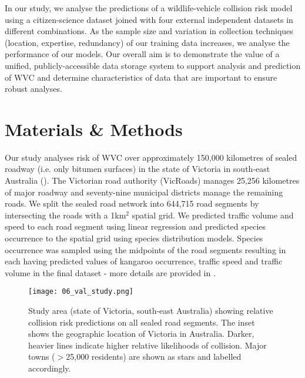 In our study, we analyse the predictions of a wildlife-vehicle collision risk model using a citizen-science dataset joined with four external independent datasets in different combinations. As the sample size and variation in collection techniques (location, expertise, redundancy) of our training data increases, we analyse the performance of our models. Our overall aim is to demonstrate the value of a unified, publicly-accessible data storage system to support analysis and prediction of WVC and determine characteristics of data that are important to ensure robust analyses.

\section{Materials \& Methods}

Our study analyses risk of WVC over approximately 150,000 kilometres of sealed roadway (i.e. only bitumen surfaces) in the state of Victoria in south-east Australia (). The Victorian road authority (VicRoads) manages 25,256 kilometres of major roadway and seventy-nine municipal districts manage the remaining roads. We split the sealed road network into 644,715 road segments by intersecting the roads with a 1km$^2$ spatial grid. We predicted traffic volume and speed to each road segment using linear regression and predicted species occurrence to the spatial grid using species distribution models. Species occurrence was sampled using the midpoints of the road segments resulting in each having predicted values of kangaroo occurrence, traffic speed and traffic volume in the final dataset - more details are provided in . 

\begin{figure*}[htp]
  \centering
  \texttt{[image: 06\_val\_study.png]}
  \caption[Wildlife-vehicle collision predictions in Victoria]{Study area (state of Victoria, south-east Australia) showing relative collision risk predictions on all sealed road segments. The inset shows the geographic location of Victoria in Australia. Darker, heavier lines indicate higher relative likelihoods of collision. Major towns ($>$25,000 residents) are shown as stars and labelled accordingly.}
  \label{val_study_area}
\end{figure*}

